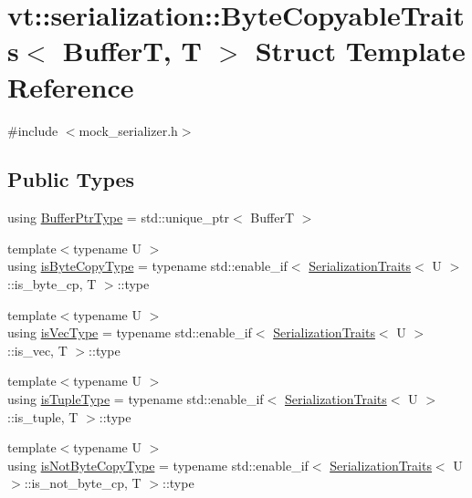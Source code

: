 \hypertarget{structvt_1_1serialization_1_1_byte_copyable_traits}{}\section{vt\+:\+:serialization\+:\+:Byte\+Copyable\+Traits$<$ BufferT, T $>$ Struct Template Reference}
\label{structvt_1_1serialization_1_1_byte_copyable_traits}


{\ttfamily \#include $<$mock\+\_\+serializer.\+h$>$}

\subsection*{Public Types}
\begin{DoxyCompactItemize}
\item 
using \hyperlink{structvt_1_1serialization_1_1_byte_copyable_traits_ab06bcaa790f4a227936f6d6854d2bf41}{Buffer\+Ptr\+Type} = std\+::unique\+\_\+ptr$<$ BufferT $>$
\item 
{\footnotesize template$<$typename U $>$ }\\using \hyperlink{structvt_1_1serialization_1_1_byte_copyable_traits_a3113636143fcf9ee209752353f9fec3a}{is\+Byte\+Copy\+Type} = typename std\+::enable\+\_\+if$<$ \hyperlink{structvt_1_1serialization_1_1_serialization_traits}{Serialization\+Traits}$<$ U $>$\+::is\+\_\+byte\+\_\+cp, T $>$\+::type
\item 
{\footnotesize template$<$typename U $>$ }\\using \hyperlink{structvt_1_1serialization_1_1_byte_copyable_traits_a99c4b667bd99e2cdaad0e0be5b21af50}{is\+Vec\+Type} = typename std\+::enable\+\_\+if$<$ \hyperlink{structvt_1_1serialization_1_1_serialization_traits}{Serialization\+Traits}$<$ U $>$\+::is\+\_\+vec, T $>$\+::type
\item 
{\footnotesize template$<$typename U $>$ }\\using \hyperlink{structvt_1_1serialization_1_1_byte_copyable_traits_ac6700c34f3c9642a029d3d3857811f59}{is\+Tuple\+Type} = typename std\+::enable\+\_\+if$<$ \hyperlink{structvt_1_1serialization_1_1_serialization_traits}{Serialization\+Traits}$<$ U $>$\+::is\+\_\+tuple, T $>$\+::type
\item 
{\footnotesize template$<$typename U $>$ }\\using \hyperlink{structvt_1_1serialization_1_1_byte_copyable_traits_a9cbf2126e3b503513822b5f4f3dfa136}{is\+Not\+Byte\+Copy\+Type} = typename std\+::enable\+\_\+if$<$ \hyperlink{structvt_1_1serialization_1_1_serialization_traits}{Serialization\+Traits}$<$ U $>$\+::is\+\_\+not\+\_\+byte\+\_\+cp, T $>$\+::type
\end{DoxyCompactItemize}
